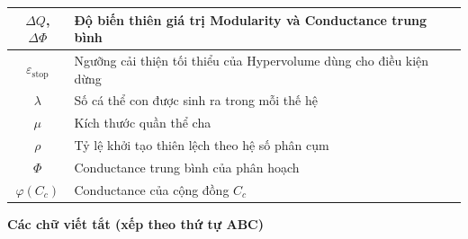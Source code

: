 \documentclass[14pt,a4paper]{extarticle}
\begin{document}
\begin{longtable}{|c|p{}|}
    $\Delta Q$, $\Delta \Phi$ & Độ biến thiên giá trị Modularity và Conductance trung bình \\ \hline
    $\varepsilon_{\mathrm{stop}}$ & Ngưỡng cải thiện tối thiểu của Hypervolume dùng cho điều kiện dừng \\ \hline
    $\lambda$ & Số cá thể con được sinh ra trong mỗi thế hệ \\ \hline
    $\mu$ & Kích thước quần thể cha \\ \hline
    $\rho$ & Tỷ lệ khởi tạo thiên lệch theo hệ số phân cụm \\ \hline
    $\Phi$ & Conductance trung bình của phân hoạch \\ \hline
    $\varphi(C_c)$ & Conductance của cộng đồng $C_c$ \\ \hline
\end{longtable}

\newpage
\noindent \textbf{\fontsize{20}{24}\selectfont Các chữ viết tắt (xếp theo thứ tự ABC)}
\end{document}
